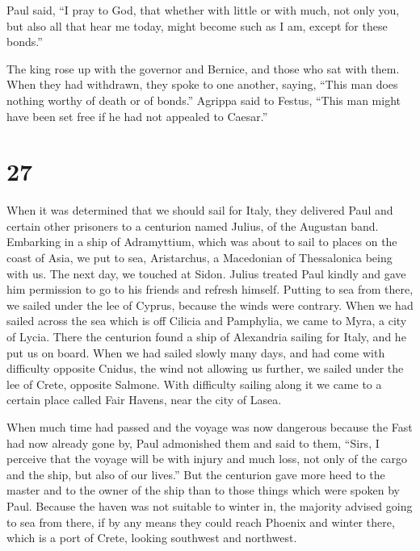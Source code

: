  Paul said, ``I pray to God, that whether with little or
with much, not only you, but also all that hear me today, might become
such as I am, except for these bonds.''

 The king rose up with the governor and Bernice, and those
who sat with them.  When they had withdrawn, they spoke to
one another, saying, ``This man does nothing worthy of death or of
bonds.''  Agrippa said to Festus, ``This man might have
been set free if he had not appealed to Caesar.''

\hypertarget{section-26}{%
\section{27}\label{section-26}}

 When it was determined that we should sail for Italy, they
delivered Paul and certain other prisoners to a centurion named Julius,
of the Augustan band.  Embarking in a ship of Adramyttium,
which was about to sail to places on the coast of Asia, we put to sea,
Aristarchus, a Macedonian of Thessalonica being with us. 
The next day, we touched at Sidon. Julius treated Paul kindly and gave
him permission to go to his friends and refresh himself. 
Putting to sea from there, we sailed under the lee of Cyprus, because
the winds were contrary.  When we had sailed across the sea
which is off Cilicia and Pamphylia, we came to Myra, a city of Lycia.
 There the centurion found a ship of Alexandria sailing for
Italy, and he put us on board.  When we had sailed slowly
many days, and had come with difficulty opposite Cnidus, the wind not
allowing us further, we sailed under the lee of Crete, opposite Salmone.
 With difficulty sailing along it we came to a certain place
called Fair Havens, near the city of Lasea.

 When much time had passed and the voyage was now dangerous
because the Fast had now already gone by, Paul admonished them
 and said to them, ``Sirs, I perceive that the voyage will
be with injury and much loss, not only of the cargo and the ship, but
also of our lives.''  But the centurion gave more heed to
the master and to the owner of the ship than to those things which were
spoken by Paul.  Because the haven was not suitable to
winter in, the majority advised going to sea from there, if by any means
they could reach Phoenix and winter there, which is a port of Crete,
looking southwest and northwest.

